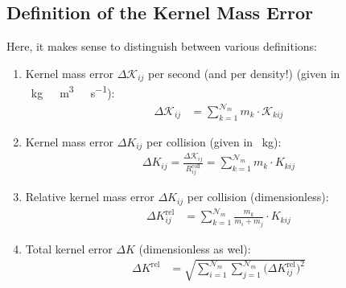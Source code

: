     \subsection{Definition of the Kernel Mass Error}

        Here, it makes sense to distinguish between various definitions:

        \begin{enumerate}

            \item Kernel mass error $\Delta \mathcal K_{ij}$ per second (and per density!)
                (given in \SI{}{\kilogram\ \meter^3\ \second^{-1}}): 
                \begin{align}
                    \Delta \mathcal K_{ij}
                        &= \sum_{k=1}^{\mathcal N_m} m_k \cdot \mathcal K_{kij}
                \end{align}

            \item Kernel mass error $\Delta K_{ij}$ per collision 
                (given in \SI{}{\kilogram}): 
                \begin{align}
                    \Delta K_{ij}
                        = \frac{\Delta \mathcal K_{ij}}{R^\text{coll}_{ij}}
                        = \sum_{k=1}^{\mathcal N_m} m_k \cdot K_{kij}
                \end{align}

            \item Relative kernel mass error $\Delta K_{ij}$ per collision 
                (dimensionless):
                \begin{align}
                    \Delta K_{ij}^\text{rel} &= \sum_{k=1}^{\mathcal N_m} \frac{m_k}{m_i+m_j} \cdot K_{kij}
                \end{align}

            \item Total kernel error $\Delta K$
                (dimensionless as wel):
                \begin{align}
                    \Delta K^\text{rel} &= \sqrt{
                        \sum_{i=1}^{\mathcal N_m}
                        \sum_{j=1}^{\mathcal N_m}
                        \big(\Delta K_{ij}^\text{rel}\big)^2
                    }
                \end{align}

        \end{enumerate}

